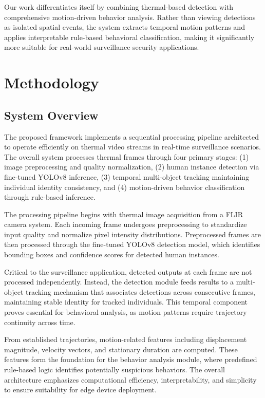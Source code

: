 \documentclass[conference]{IEEEtran}
\begin{document}
Our work differentiates itself by combining thermal-based detection with comprehensive motion-driven behavior analysis. Rather than viewing detections as isolated spatial events, the system extracts temporal motion patterns and applies interpretable rule-based behavioral classification, making it significantly more suitable for real-world surveillance security applications.

\section{Methodology}

\subsection{System Overview}

The proposed framework implements a sequential processing pipeline architected to operate efficiently on thermal video streams in real-time surveillance scenarios. The overall system processes thermal frames through four primary stages: (1) image preprocessing and quality normalization, (2) human instance detection via fine-tuned YOLOv8 inference, (3) temporal multi-object tracking maintaining individual identity consistency, and (4) motion-driven behavior classification through rule-based inference.

The processing pipeline begins with thermal image acquisition from a FLIR camera system. Each incoming frame undergoes preprocessing to standardize input quality and normalize pixel intensity distributions. Preprocessed frames are then processed through the fine-tuned YOLOv8 detection model, which identifies bounding boxes and confidence scores for detected human instances.

Critical to the surveillance application, detected outputs at each frame are not processed independently. Instead, the detection module feeds results to a multi-object tracking mechanism that associates detections across consecutive frames, maintaining stable identity for tracked individuals. This temporal component proves essential for behavioral analysis, as motion patterns require trajectory continuity across time.

From established trajectories, motion-related features including displacement magnitude, velocity vectors, and stationary duration are computed. These features form the foundation for the behavior analysis module, where predefined rule-based logic identifies potentially suspicious behaviors. The overall architecture emphasizes computational efficiency, interpretability, and simplicity to ensure suitability for edge device deployment.
\end{document}

